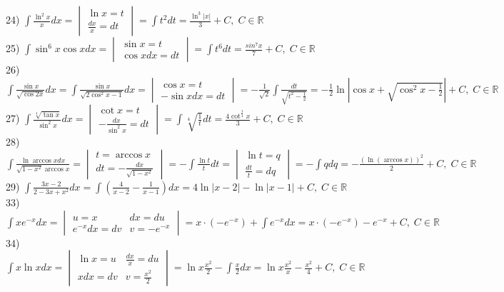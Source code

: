 \documentclass[14pt]{article}
\begin{document}
	24) $\int \frac{\ln^2x}{x}dx = \begin{vmatrix}
		\ln x = t \\
		\frac{dx}{x} = dt 
	\end{vmatrix} = \int t^2dt = \frac{\ln^3|x|}{3} + C, \; C \in \mathbb{R}$\\
	25) $\int \sin^6x \cos x dx = \begin{vmatrix}
		\sin x = t \\
		\cos x dx = dt
	\end{vmatrix} = \int t^6 dt = \frac{sin^7x}{7} + C, \; C \in \mathbb{R}$ \\
	26) $\int \frac{\sin x}{\sqrt{\cos 2x}}dx = \int \frac{\sin x }{\sqrt{2\cos^2 x - 1}}dx = 
	\begin{vmatrix}
		\cos x = t \\
		-\sin x dx=dt  	
	\end{vmatrix} = -\frac{1}{\sqrt{2}}\int \frac{dt}{\sqrt{t^2-\frac{1}{2}}} = -\frac{1}{2} \ln|\cos x + \sqrt{\cos^2x-\frac{1}{2}}|+C, \; C \in \mathbb{R}$ \\
	27)  $\int \frac{\sqrt[4]{\tan x}}{\sin^2x}dx = \begin{vmatrix}
		\cot x = t \\
		-\frac{dx}{\sin^2x} = dt 
	\end{vmatrix} = \int \sqrt[4]{\frac{1}{t}}dt = \frac{4\cot^{\frac{3}{4}}x}{3}+C, \; C \in \mathbb{R}$ \\
	28) $\int \frac{\ln \arccos x dx}{\sqrt{1-x^2}\arccos x} = \begin{vmatrix}
		t = \arccos x \\
		dt = -\frac{dx}{\sqrt{1-x^2}}
	\end{vmatrix} = -\int \frac{\ln t }{t} dt = \begin{vmatrix}
		\ln t = q \\
		\frac{dt}{t} = dq
	\end{vmatrix} = -\int q dq = -\frac{(\ln(\arccos x))^2}{2} + C, \; C \in \mathbb{R}$ \\
	29) $\int \frac{3x-2}{2-3x+x^2}dx = \int (\frac{4}{x-2} - \frac{1}{x-1})dx = 4\ln|x-2| - \ln|x-1| + C, \; C \in \mathbb{R}$ \\
	33) $\int x e^{-x}dx = \begin{vmatrix}
		u = x & dx = du \\
		e^{-x}dx = dv & v=-e^{-x}
	\end{vmatrix}= x\cdot (-e^{-x})+\int e^{-x}dx = x\cdot (-e^{-x}) - e^{-x} + C, \; C \in \mathbb{R}$ \\
	34) $\int x \ln x dx = \begin{vmatrix}
		\ln x = u & \frac{dx}{x} = du \\
		xdx = dv & v = \frac{x^2}{2} 
	\end{vmatrix} = \ln x \frac{x^2}{2} - \int \frac{x}{2} dx = \ln x \frac{x^2}{x} - \frac{x^2}{4} + C, \; C \in \mathbb{R}$ \\
\end{document}
